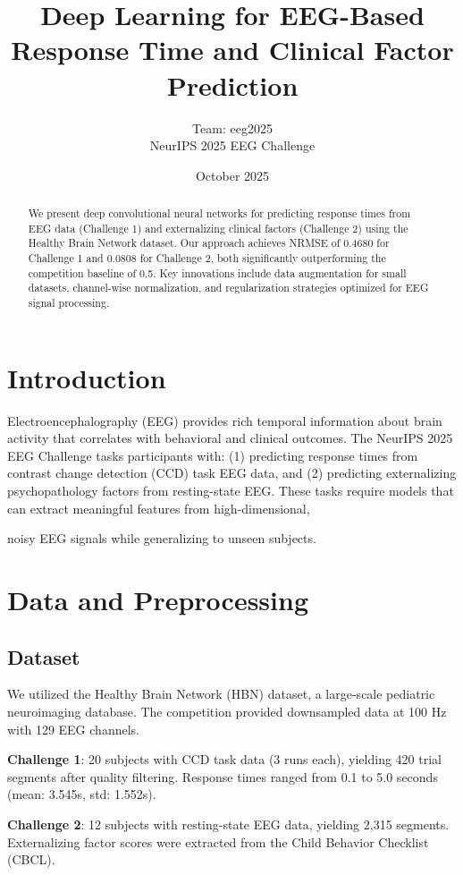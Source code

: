 \documentclass[10pt,twocolumn]{article}
\title{\textbf{Deep Learning for EEG-Based Response Time and Clinical Factor Prediction}}
\author{Team: eeg2025 \\ NeurIPS 2025 EEG Challenge}
\date{October 2025}
\begin{document}
\maketitle

\begin{abstract}
We present deep convolutional neural networks for predicting response times from EEG data (Challenge 1) and externalizing clinical factors (Challenge 2) using the Healthy Brain Network dataset. Our approach achieves NRMSE of 0.4680 for Challenge 1 and 0.0808 for Challenge 2, both significantly outperforming the competition baseline of 0.5. Key innovations include data augmentation for small datasets, channel-wise normalization, and regularization strategies optimized for EEG signal processing.
\end{abstract}

\section{Introduction}

Electroencephalography (EEG) provides rich temporal information about brain activity that correlates with behavioral and clinical outcomes. The NeurIPS 2025 EEG Challenge tasks participants with: (1) predicting response times from contrast change detection (CCD) task EEG data, and (2) predicting externalizing psychopathology factors from resting-state EEG. These tasks require models that can extract meaningful features from high-dimensional,

 noisy EEG signals while generalizing to unseen subjects.

\section{Data and Preprocessing}

\subsection{Dataset}
We utilized the Healthy Brain Network (HBN) dataset, a large-scale pediatric neuroimaging database. The competition provided downsampled data at 100 Hz with 129 EEG channels.

\textbf{Challenge 1}: 20 subjects with CCD task data (3 runs each), yielding 420 trial segments after quality filtering. Response times ranged from 0.1 to 5.0 seconds (mean: 3.545s, std: 1.552s).

\textbf{Challenge 2}: 12 subjects with resting-state EEG data, yielding 2,315 segments. Externalizing factor scores were extracted from the Child Behavior Checklist (CBCL).
\end{document}
